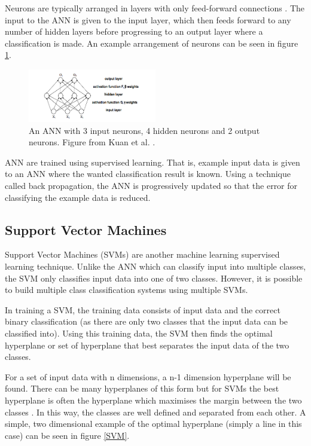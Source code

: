 Neurons are typically arranged in layers with only feed-forward connections \cite{Kuan}. The input to the ANN is given to the input layer, which then feeds forward to any number of hidden layers before progressing to an output layer where a classification is made. An example arrangement of neurons can be seen in figure \ref{ANN}. 

\begin{figure}[ht!]
\begin{center}
\leavevmode
\includegraphics[width=0.5\textwidth]{images/ANN.png}
\end{center}
\caption[Example Artificial Neural Network]{An ANN with 3 input neurons, 4 hidden neurons and 2 output neurons. Figure from Kuan et al. \cite{Kuan}.}
\label{ANN}
\end{figure}

ANN are trained using supervised learning. That is, example input data is given to an ANN where the wanted classification result is known. Using a technique called back propagation, the ANN is progressively updated so that the error for classifying the example data is reduced.  


\subsection{Support Vector Machines}
\label{SVMAppendix}

Support Vector Machines (SVMs) are another machine learning supervised learning technique. Unlike the ANN which can classify input into multiple classes, the SVM only classifies input data into one of two classes. However, it is possible to build  multiple class classification systems using multiple SVMs. 

In training a SVM, the training data consists of input data and the correct binary classification (as there are only two classes that the input data can be classified into).  Using this training data, the SVM then finds the optimal hyperplane or set of hyperplane that best separates the input data of the two classes.  \cite{Jordan2008}

For a set of input data with n dimensions, a n-1 dimension hyperplane will be found. There can be many hyperplanes of this form but for SVMs the best hyperplane is often the hyperplane which maximises the margin between the two classes \cite{Jordan2008}. In this way, the classes are well defined and separated from each other. A simple, two dimensional example of the optimal hyperplane (simply a line in this case) can be seen in figure \ref{SVM}.

